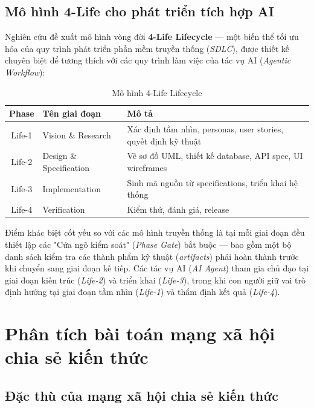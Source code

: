 \documentclass[13pt,a4paper,oneside]{extreport}
\numberwithin{equation}{chapter}
\numberwithin{figure}{chapter}
\numberwithin{table}{chapter}
\begin{document}
\subsection{Mô hình 4-Life cho phát triển tích hợp AI}

Nghiên cứu đề xuất mô hình vòng đời \textbf{4-Life Lifecycle} — một biến thể tối ưu hóa của quy trình phát triển phần mềm truyền thống (\textit{SDLC}), được thiết kế chuyên biệt để tương thích với các quy trình làm việc của tác vụ AI (\textit{Agentic Workflow}):

\begin{table}[H]
\centering
\caption{Mô hình 4-Life Lifecycle}
\begin{tabular}{|c|p{3cm}|p{8.5cm}|}
\hline
\textbf{Phase} & \textbf{Tên giai đoạn} & \textbf{Mô tả} \\
\hline
Life-1 & Vision \& Research & Xác định tầm nhìn, personas, user stories, quyết định kỹ thuật \\
\hline
Life-2 & Design \& Specification & Vẽ sơ đồ UML, thiết kế database, API spec, UI wireframes \\
\hline
Life-3 & Implementation & Sinh mã nguồn từ specifications, triển khai hệ thống \\
\hline
Life-4 & Verification & Kiểm thử, đánh giá, release \\
\hline
\end{tabular}
\end{table}

Điểm khác biệt cốt yếu so với các mô hình truyền thống là tại mỗi giai đoạn đều thiết lập các "Cửa ngõ kiểm soát" (\textit{Phase Gate}) bắt buộc — bao gồm một bộ danh sách kiểm tra các thành phẩm kỹ thuật (\textit{artifacts}) phải hoàn thành trước khi chuyển sang giai đoạn kế tiếp. Các tác vụ AI (\textit{AI Agent}) tham gia chủ đạo tại giai đoạn kiến trúc (\textit{Life-2}) và triển khai (\textit{Life-3}), trong khi con người giữ vai trò định hướng tại giai đoạn tầm nhìn (\textit{Life-1}) và thẩm định kết quả (\textit{Life-4}).

\section{Phân tích bài toán mạng xã hội chia sẻ kiến thức}

\subsection{Đặc thù của mạng xã hội chia sẻ kiến thức}
\end{document}
